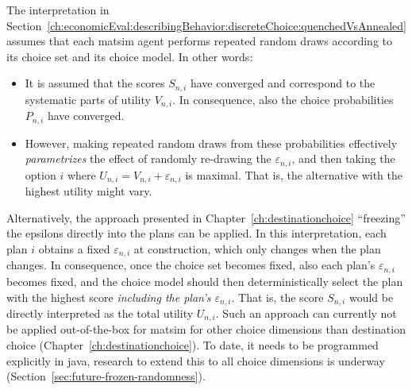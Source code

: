 The interpretation in Section~\ref{ch:economicEval:describingBehavior:discreteChoice:quenchedVsAnnealed} assumes that each \acrshort{matsim} agent performs repeated random draws according to its choice set and its choice model. 
%
In other words:
%
\begin{itemize}\styleItemize
\item It is assumed that the scores $S_{n,i}$ have converged and correspond to the systematic parts of utility $V_{n,i}$. In consequence, also the choice probabilities $P_{n,i}$ have converged.
%
\item However, making repeated random draws from these probabilities effectively \emph{parametrizes} the effect of randomly re-drawing the $\varepsilon_{n,i}$, and then taking the option $i$ where $U_{n,i} = V_{n,i} + \varepsilon_{n,i}$ is maximal. That is, the alternative with the highest utility might vary.
\end{itemize}
%

Alternatively, the approach presented in Chapter~\ref{ch:destinationchoice} ``freezing'' the epsilons directly into the plans can be applied.  
In this interpretation, each plan $i$ obtains a fixed $\varepsilon_{n,i}$ at construction, which only changes when the plan changes. 
In consequence, once the choice set becomes fixed, also each plan's $\varepsilon_{n,i}$ becomes fixed, and the choice model should then deterministically select the plan with the highest score \emph{including the plan's $\varepsilon_{n,i}$}.
%
That is, the score $S_{n,i}$ would be directly interpreted as the total utility $U_{n,i}$.
%
Such an approach can currently not be applied out-of-the-box for \acrshort{matsim} for other choice dimensions than destination choice (Chapter~\ref{ch:destinationchoice}).
To date, it needs to be programmed explicitly in \gls{java}, research to extend this to all choice dimensions is underway (Section~\ref{sec:future-frozen-randomness}). 

